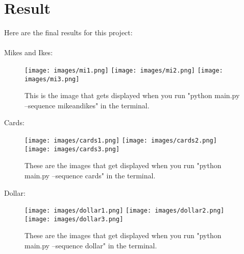 \section*{Result}
Here are the final results for this project: \\
\\ Mikes and Ikes:
\begin{figure}[h]
    \centering
    \texttt{[image: images/mi1.png]}
    \texttt{[image: images/mi2.png]}
    \texttt{[image: images/mi3.png]}
    \caption{This is the image that gets displayed when you run "python main.py --sequence mikeandikes" in the terminal.}
    \label{fig:result1}
\end{figure}

\newpage

Cards:
\begin{figure}[h]
    \centering
    \texttt{[image: images/cards1.png]}
    \texttt{[image: images/cards2.png]}
    \texttt{[image: images/cards3.png]}
    \caption{These are the images that get displayed when you run "python main.py --sequence cards" in the terminal.}
    \label{fig:result1}
\end{figure}

\newpage

Dollar:
\begin{figure}[h]
    \centering
    \texttt{[image: images/dollar1.png]}
    \texttt{[image: images/dollar2.png]}
    \texttt{[image: images/dollar3.png]}
    \caption{These are the images that get displayed when you run "python main.py --sequence dollar" in the terminal.}
    \label{fig:result1}
\end{figure}


